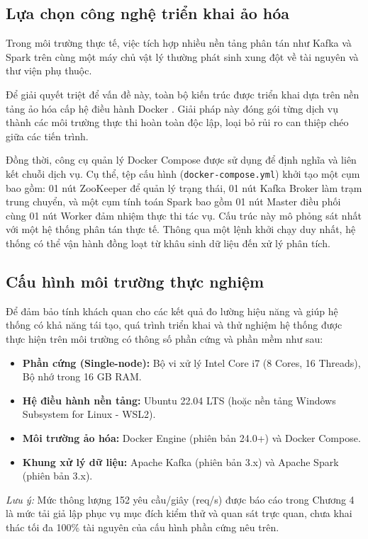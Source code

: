 \documentclass[12pt,a4paper]{report}
\begin{document}
\subsection{Lựa chọn công nghệ triển khai ảo hóa}
Trong môi trường thực tế, việc tích hợp nhiều nền tảng phân tán như Kafka và Spark trên cùng một máy chủ vật lý thường phát sinh xung đột về tài nguyên và thư viện phụ thuộc. 

Để giải quyết triệt để vấn đề này, toàn bộ kiến trúc được triển khai dựa trên nền tảng ảo hóa cấp hệ điều hành Docker \cite{docker_doc}. Giải pháp này đóng gói từng dịch vụ thành các môi trường thực thi hoàn toàn độc lập, loại bỏ rủi ro can thiệp chéo giữa các tiến trình. 

Đồng thời, công cụ quản lý Docker Compose được sử dụng để định nghĩa và liên kết chuỗi dịch vụ. Cụ thể, tệp cấu hình (\texttt{docker-compose.yml}) khởi tạo một cụm bao gồm: 01 nút ZooKeeper để quản lý trạng thái, 01 nút Kafka Broker làm trạm trung chuyển, và một cụm tính toán Spark bao gồm 01 nút Master điều phối cùng 01 nút Worker đảm nhiệm thực thi tác vụ. Cấu trúc này mô phỏng sát nhất với một hệ thống phân tán thực tế. Thông qua một lệnh khởi chạy duy nhất, hệ thống có thể vận hành đồng loạt từ khâu sinh dữ liệu đến xử lý phân tích.

\subsection{Cấu hình môi trường thực nghiệm}
Để đảm bảo tính khách quan cho các kết quả đo lường hiệu năng và giúp hệ thống có khả năng tái tạo, quá trình triển khai và thử nghiệm hệ thống được thực hiện trên môi trường có thông số phần cứng và phần mềm như sau:

\begin{itemize}
    \item \textbf{Phần cứng (Single-node):} Bộ vi xử lý Intel Core i7 (8 Cores, 16 Threads), Bộ nhớ trong 16 GB RAM.
    \item \textbf{Hệ điều hành nền tảng:} Ubuntu 22.04 LTS (hoặc nền tảng Windows Subsystem for Linux - WSL2).
    \item \textbf{Môi trường ảo hóa:} Docker Engine (phiên bản 24.0+) và Docker Compose.
    \item \textbf{Khung xử lý dữ liệu:} Apache Kafka (phiên bản 3.x) và Apache Spark (phiên bản 3.x).
\end{itemize}

\textit{Lưu ý:} Mức thông lượng 152 yêu cầu/giây (req/s) được báo cáo trong Chương 4 là mức tải giả lập phục vụ mục đích kiểm thử và quan sát trực quan, chưa khai thác tối đa 100\% tài nguyên của cấu hình phần cứng nêu trên.
\end{document}
